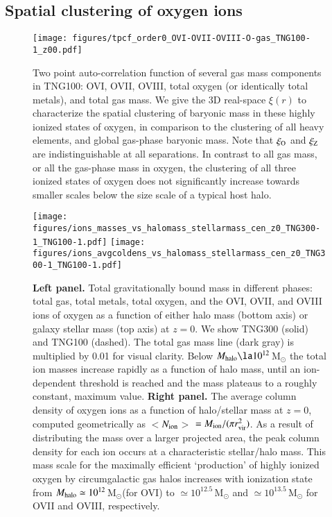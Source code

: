 \documentclass[useAMS,usenatbib]{mnras}
\newcommand{\msun}{\,M$_{\odot}$\xspace}
\newcommand{\ovi}{OVI\xspace}
\newcommand{\ovii}{OVII\xspace}
\newcommand{\oviii}{OVIII\xspace}
\begin{document}
\subsection{Spatial clustering of oxygen ions}

\begin{figure}
\centering
\texttt{[image: figures/tpcf\_order0\_OVI-OVII-OVIII-O-gas\_TNG100-1\_z00.pdf]}
\caption{ Two point auto-correlation function of several gas mass components in TNG100: \ovi, \ovii, \oviii, total oxygen (or identically total metals), and total gas mass. We give the 3D real-space $\xi(r)$ to characterize the spatial clustering of baryonic mass in these highly ionized states of oxygen, in comparison to the clustering of all heavy elements, and global gas-phase baryonic mass. Note that $\xi_{\rm O}$ and $\xi_{\rm Z}$ are indistinguishable at all separations. In contrast to all gas mass, or all the gas-phase mass in oxygen, the clustering of all three ionized states of oxygen does not significantly increase towards smaller scales below the size scale of a typical host halo.
 \label{fig_tpcf}}
\end{figure}

\begin{figure*}
\centering
\texttt{[image: figures/ions\_masses\_vs\_halomass\_stellarmass\_cen\_z0\_TNG300-1\_TNG100-1.pdf]}
\texttt{[image: figures/ions\_avgcoldens\_vs\_halomass\_stellarmass\_cen\_z0\_TNG300-1\_TNG100-1.pdf]}
\caption{ \textbf{Left panel.} Total gravitationally bound mass in different phases: total gas, total metals, total oxygen, and the OVI, OVII, and OVIII ions of oxygen as a function of either halo mass (bottom axis) or galaxy stellar mass (top axis) at $z=0$. We show TNG300 (solid) and TNG100 (dashed). The total gas mass line (dark gray) is multiplied by 0.01 for visual clarity. Below $M_{\rm halo} \la 10^{12}$\msun the total ion masses increase rapidly as a function of halo mass, until an ion-dependent threshold is reached and the mass plateaus to a roughly constant, maximum value. \textbf{Right panel.} The average column density of oxygen ions as a function of halo/stellar mass at $z=0$, computed geometrically as $<$$N_{\rm ion}$$>$ $= M_{\rm ion} / (\pi r_{\rm vir}^2)$. As a result of distributing the mass over a larger projected area, the peak column density for each ion occurs at a characteristic stellar/halo mass. This mass scale for the maximally efficient `production' of highly ionized oxygen by circumgalactic gas halos increases with ionization state from $M_{\rm halo} \simeq 10^{12}$\msun (for \ovi) to $\simeq 10^{12.5}$\msun and $\simeq 10^{13.5}$\msun for \ovii and \oviii, respectively.
 \label{fig_ions_vs_mass}}
\end{figure*}
\end{document}
